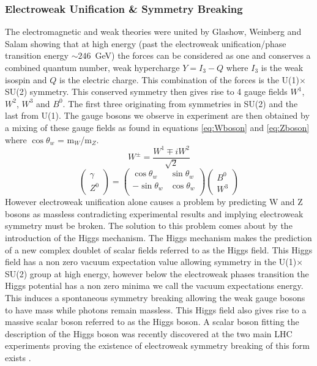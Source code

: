     \subsubsection*{Electroweak Unification \& Symmetry Breaking}
    The electromagnetic and weak theories were united by Glashow, Weinberg and Salam \cite{} showing that at high energy (past the electroweak unification/phase transition energy $\sim246$~GeV) the forces can be considered as one and conserves a combined quantum number, weak hypercharge $Y = I_{3} - Q$ where $I_{3}$ is the weak isospin and $Q$ is the electric charge. This combination of the forces is the U(1)$\times$SU(2) symmetry. This conserved symmetry then gives rise to 4 gauge fields $W^{1}$, $W^{2}$, $W^{3}$ and $B^{0}$. The first three originating from symmetries in SU(2) and the last from U(1). The gauge bosons we observe in experiment are then obtained by a mixing of these gauge fields as found in equations \ref{eq:Wboson} and \ref{eq:Zboson} where $\cos{\theta_{w}}$ = m$_{W}$/m$_{Z}$.
    \begin{equation}
        W^{\pm} = \frac{W^{1} \mp iW^{2}}{\sqrt{2}}
      \label{eq:Wboson}
    \end{equation}
    \begin{equation}
        \left(\begin{array}{c} \gamma \\ Z^{0}\end{array}\right)
          = \left( \begin{array}{cc} 
              \cos\theta_{w} & \sin\theta_{w} \\  
              -\sin\theta_{w} & \cos\theta_{w} \\ 
            \end{array} \right)
            \left(\begin{array}{c} B^{0} \\ W^{3}\end{array}\right)
      \label{eq:Zboson}
    \end{equation}
    However electroweak unification alone causes a problem by predicting W and Z bosons as massless contradicting experimental results and implying electroweak symmetry must be broken. The solution to this problem comes about by the introduction of the Higgs mechanism\cite{}. The Higgs mechanism makes the prediction of a new complex doublet of scalar fields referred to as the Higgs field. This Higgs field has a non zero vacuum expectation value allowing symmetry in the U(1)$\times$SU(2) group at high energy, however below the electroweak phases transition the Higgs potential has a non zero minima we call the vacuum expectations energy. This induces a spontaneous symmetry breaking allowing the weak gauge bosons to have mass while photons remain massless. This Higgs field also gives rise to a massive scalar boson referred to as the Higgs boson. A scalar boson fitting the description of the Higgs boson was recently discovered at the two main LHC experiments proving the existence of electroweak symmetry breaking of this form exists \cite{Aad20121,Chatrchyan201230}. 


